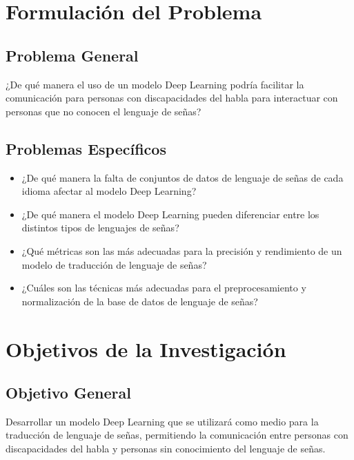 \section{Formulación del Problema}


\subsection{Problema General}
\newcommand{\ProblemaGeneral}{
	¿De qué manera el uso de un modelo Deep Learning podría facilitar la comunicación para personas con discapacidades del habla para interactuar con personas que no conocen el lenguaje de señas?
}
\ProblemaGeneral
\subsection{Problemas Espec\'{i}ficos}
\newcommand{\Pbone}{
	¿De qué manera la falta de conjuntos de datos de lenguaje de señas de cada idioma afectar al modelo Deep Learning? 
}
\newcommand{\Pbtwo}{
	¿De qué manera el modelo Deep Learning pueden diferenciar entre los distintos tipos de lenguajes de señas?
}
\newcommand{\Pbthree}{
	¿Qué métricas son las más adecuadas para la precisión y rendimiento de un modelo de traducción de lenguaje de señas? 
}

\newcommand{\Pbfour}{
	¿Cuáles son las técnicas más adecuadas para el preprocesamiento y normalización de la base de datos de lenguaje de señas? 
}


\begin{itemize}
	\item \Pbone
	\item \Pbtwo
	\item \Pbthree
	\item \Pbfour
\end{itemize}

\section{Objetivos de la Investigación}
\subsection{Objetivo General}
\newcommand{\ObjetivoGeneral}{
Desarrollar un modelo Deep Learning que se utilizará como medio para la traducción de lenguaje de señas, permitiendo la comunicación entre personas con discapacidades del habla y personas sin conocimiento del lenguaje de señas.
}
\ObjetivoGeneral
